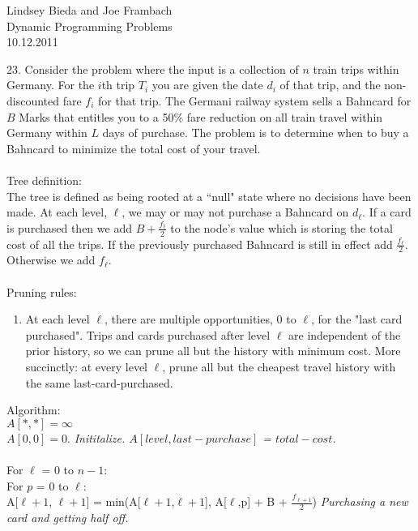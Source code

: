 \documentclass[10pt]{article}
\newcommand{\tab}{\hspace*{2em}}
\newcommand{\tabb}{\hspace*{4em}}
\begin{document}
	\begin{flushright}
	Lindsey Bieda and Joe Frambach\\
	Dynamic Programming Problems\\
	10.12.2011
	\end{flushright}
	23.	Consider the problem where the input is a collection of $n$ train trips within Germany. For the $i$th trip
		$T_i$ you are given the date $d_i$ of that trip, and the non-discounted fare $f_i$ for that trip. The Germani
		railway system sells a Bahncard for $B$ Marks that entitles you to a 50\% fare reduction on all train travel
		within Germany within $L$ days of purchase. The problem is to determine when to buy a Bahncard to
		minimize the total cost of your travel.\\
		\\
		Tree definition:\\
		The tree is defined as being rooted at a ``null" state where no decisions have been made. At each level, $\ell$,
		we may or may not purchase a Bahncard on $d_\ell$. If a card is purchased then we add $B + \frac{f_\ell}{2}$ to
		the node's value which is storing the total cost of all the trips. If the previously purchased Bahncard is still
		in effect add $\frac{f_\ell}{2}$. Otherwise we add $f_\ell$. \\
		\\ 
		Pruning rules:
		\begin{enumerate}
			\item At each level $\ell$, there are multiple opportunities, $0$ to $\ell$, for the "last card purchased".
			Trips and cards purchased after level $\ell$ are independent of the prior history, so we can prune all
			but the history with minimum cost. More succinctly: at every level $\ell$, prune all but the cheapest
			travel history with the same last-card-purchased.\\
		\end{enumerate}
		Algorithm:\\
		$A[*,*] = \infty$\\
		$A[0,0] = 0.$ \emph{Inititalize. $A[level,last-purchase]$ = $total-cost$.}\\
		\\
		For $\ell$ = 0 to $n-1$:\\
		\tab For $p$ = 0 to $\ell$:\\
		\tabb A[$\ell+1$, $\ell+1$] = min(A[$\ell+1$,$\ell+1$], A[$\ell$,p] + B +  $\frac{f_{\ell+1}}{2}$) \emph{Purchasing a new card and getting half off.}\\
\end{document}
